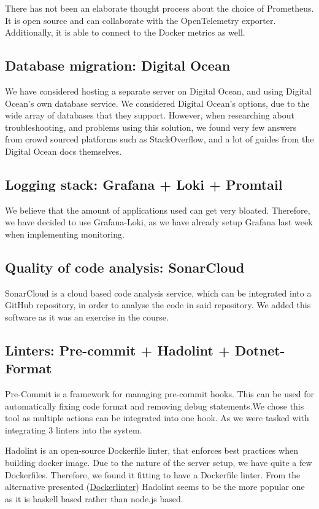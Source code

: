 There has not been an elaborate thought process about the choice of Prometheus. It is open source and can collaborate with the OpenTelemetry exporter. Additionally, it is able to connect to the Docker metrics as well.

\subsection{Database migration: Digital Ocean}

We have considered hosting a separate server on Digital Ocean, and using Digital Ocean's own database service. We considered Digital Ocean's options, due to the wide array of databases that they support. However, when researching about troubleshooting, and problems using this solution, we found very few answers from crowd sourced platforms such as StackOverflow, and a lot of guides from the Digital Ocean docs themselves.

\subsection{Logging stack: Grafana + Loki + Promtail}

We believe that the amount of applications used can get very bloated. Therefore, we have decided to use Grafana-Loki, as we have already setup Grafana last week when implementing monitoring.

\subsection{Quality of code analysis: SonarCloud}

SonarCloud is a cloud based code analysis service, which can be integrated into a GitHub repository, in order to analyse the code in said repository. We added this software as it was an exercise in the course.

\subsection{Linters: Pre-commit + Hadolint + Dotnet-Format}
Pre-Commit is a framework for managing pre-commit hooks. This can be used for automatically fixing code format and removing debug statements.We chose this tool as multiple actions can be integrated into one hook. As we were tasked with integrating 3 linters into the system.

Hadolint is an open-source Dockerfile linter, that enforces best practices when building docker image. Due to the nature of the server setup, we have quite a few Dockerfiles. Therefore, we found it fitting to have a Dockerfile linter. From the alternative presented (\href{https://github.com/RedCoolBeans/dockerlint}{Dockerlinter}) Hadolint seems to be the more popular one as it is haskell based rather than node.js based.

